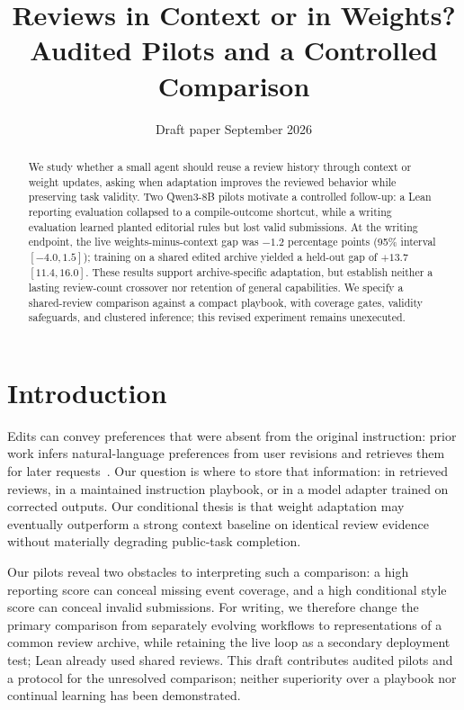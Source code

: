 \documentclass[10pt,twocolumn,letterpaper]{article}
\title{Reviews in Context or in Weights?\\Audited Pilots and a Controlled Comparison}
\author{Draft paper\quad 28 September 2026}
\newcommand{\claim}[2]{#2}
\begin{document}
\maketitle
\begin{abstract}
\claim{C01}{We study whether a small agent should reuse a review history through context or weight updates, asking when adaptation improves the reviewed behavior while preserving task validity.}
\claim{C02}{Two Qwen3-8B pilots motivate a controlled follow-up: a Lean reporting evaluation collapsed to a compile-outcome shortcut, while a writing evaluation learned planted editorial rules but lost valid submissions.}
\claim{C03}{At the writing endpoint, the live weights-minus-context gap was $-1.2$ percentage points (95\% interval $[-4.0,1.5]$); training on a shared edited archive yielded a held-out gap of $+13.7$ $[11.4,16.0]$.}
\claim{C04}{These results support archive-specific adaptation, but establish neither a lasting review-count crossover nor retention of general capabilities.}
\claim{C05}{We specify a shared-review comparison against a compact playbook, with coverage gates, validity safeguards, and clustered inference; this revised experiment remains unexecuted.}
\end{abstract}

\section{Introduction}
\claim{C06}{Edits can convey preferences that were absent from the original instruction: prior work infers natural-language preferences from user revisions and retrieves them for later requests~\cite{gao}.}
\claim{C07}{Our question is where to store that information: in retrieved reviews, in a maintained instruction playbook, or in a model adapter trained on corrected outputs.}
\claim{C08}{Our conditional thesis is that weight adaptation may eventually outperform a strong context baseline on identical review evidence without materially degrading public-task completion.}

\claim{C09}{Our pilots reveal two obstacles to interpreting such a comparison: a high reporting score can conceal missing event coverage, and a high conditional style score can conceal invalid submissions.}
\claim{C10}{For writing, we therefore change the primary comparison from separately evolving workflows to representations of a common review archive, while retaining the live loop as a secondary deployment test; Lean already used shared reviews.}
\claim{C11}{This draft contributes audited pilots and a protocol for the unresolved comparison; neither superiority over a playbook nor continual learning has been demonstrated.}
\end{document}
